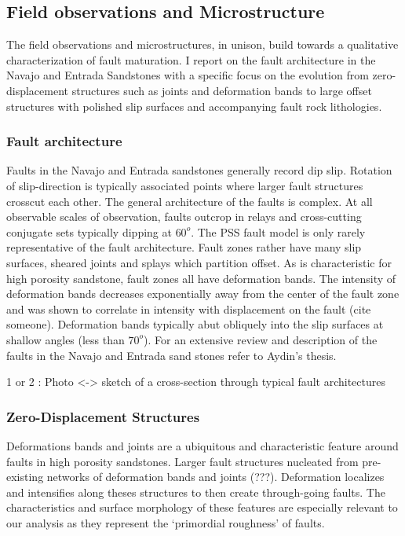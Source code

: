 \documentclass[12pt,a4paper]{article}
\begin{document}
\subsection{Field observations and Microstructure}

The field observations and microstructures, in unison, build towards a qualitative characterization of fault maturation. I report on the fault architecture in the Navajo and Entrada Sandstones with a specific focus on the evolution from zero-displacement structures such as joints and deformation bands to large offset structures with polished slip surfaces and accompanying fault rock lithologies.

\subsubsection{Fault architecture}

Faults in the Navajo and Entrada sandstones generally record dip slip. Rotation of slip-direction is typically associated points where larger fault structures crosscut each other.  The general architecture of the faults is complex. At all observable scales of observation, faults outcrop in relays and cross-cutting conjugate sets typically dipping at $60^o$. The PSS fault model is only rarely representative of the fault architecture. Fault zones rather have many slip surfaces, sheared joints and splays which partition offset.  As is characteristic for high porosity sandstone, fault zones all have deformation bands. The intensity of deformation bands decreases exponentially away from the center of the fault zone and was shown to correlate in intensity with displacement on the fault (cite someone). Deformation bands typically abut obliquely into the slip surfaces at shallow angles (less than $70^o$). For an extensive review and description of the faults in the Navajo and Entrada sand stones refer to Aydin’s thesis.

1 or 2 : Photo <-> sketch  of a cross-section through typical fault architectures

\subsubsection{Zero-Displacement Structures}

Deformations bands and joints are a ubiquitous and characteristic feature around faults in high porosity sandstones. Larger fault structures nucleated from pre-existing networks of deformation bands and joints (\cite{davatzes2000}???). Deformation localizes and intensifies along theses structures to then create through-going faults. The characteristics and surface morphology of these features are especially relevant to our analysis as they represent the ‘primordial roughness’ of faults. 
\end{document}
